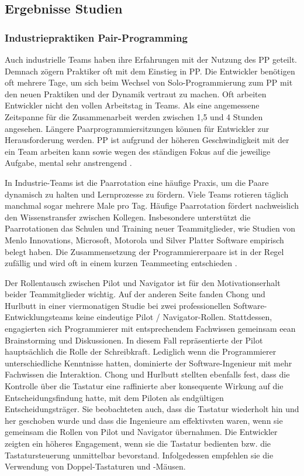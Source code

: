\subsection{Ergebnisse Studien}

\subsubsection{ Industriepraktiken Pair-Programming}

Auch industrielle Teams haben ihre Erfahrungen mit der Nutzung des PP geteilt. Demnach zögern Praktiker oft mit dem Einstieg in PP. Die Entwickler benötigen oft mehrere Tage, um sich beim Wechsel von Solo-Programmierung zum PP\cite{JariVanhanenHarriKorpi2007ExperiencesProgramming} mit den neuen Praktiken und der Dynamik vertraut zu machen. Oft arbeiten Entwickler nicht den vollen Arbeitstag in Teams. Als eine angemessene Zeitspanne für die Zusammenarbeit werden zwischen 1,5 und 4 Stunden angesehen. Längere Paarprogrammiersitzungen können für Entwickler zur Herausforderung werden. PP ist aufgrund der höheren Geschwindigkeit mit der ein Team arbeiten kann sowie wegen des ständigen Fokus auf die jeweilige Aufgabe, mental sehr anstrengend \cite{Williams2010PairProgramming,Cockburn2001TheProgramming}.


In Industrie-Teams ist die Paarrotation eine häufige Praxis, um die Paare dynamisch zu halten und Lernprozesse zu fördern. Viele Teams rotieren täglich manchmal sogar mehrere Male pro Tag. Häufige Paarrotation fördert nachweislich den Wissenstransfer zwischen Kollegen. Insbesondere unterstützt die Paarrotationen das Schulen und Training neuer Teammitglieder, wie Studien von Menlo Innovations, Microsoft, Motorola und Silver Platter Software empirisch belegt haben. Die Zusammensetzung der Programmiererpaare ist in der Regel zufällig und wird oft in einem kurzen Teammeeting entschieden \cite{Williams2010PairProgramming}.

Der Rollentausch zwischen Pilot und Navigator ist für den Motivationserhalt beider Teammitglieder wichtig. Auf der anderen Seite fanden Chong und Hurlbutt \cite{Chong2007TheProgramming} in einer viermonatigen Studie bei zwei professionellen Software-Entwicklungsteams keine eindeutige Pilot / Navigator-Rollen. Stattdessen, engagierten sich Programmierer mit entsprechendem Fachwissen gemeinsam eean Brainstorming und Diskussionen. In diesem Fall repräsentierte der Pilot hauptsächlich die Rolle der Schreibkraft. Lediglich wenn die Programmierer unterschiedliche Kenntnisse hatten, dominierte der Software-Ingenieur mit mehr Fachwissen die Interaktion. Chong und Hurlbutt \cite{Chong2007TheProgramming} stellten ebenfalls fest, dass die Kontrolle über die Tastatur eine raffinierte aber konsequente Wirkung auf die Entscheidungsfindung hatte, mit dem Piloten als endgültigen Entscheidungsträger. Sie beobachteten auch, dass die Tastatur wiederholt hin und her geschoben wurde und dass die Ingenieure am effektivsten waren, wenn sie gemeinsam die Rollen von Pilot und Navigator übernahmen. Die Entwickler zeigten ein höheres Engagement, wenn sie die Tastatur bedienten bzw. die Tastatursteuerung unmittelbar bevorstand. Infolgedessen empfehlen sie die Verwendung von Doppel-Tastaturen und -Mäusen.

